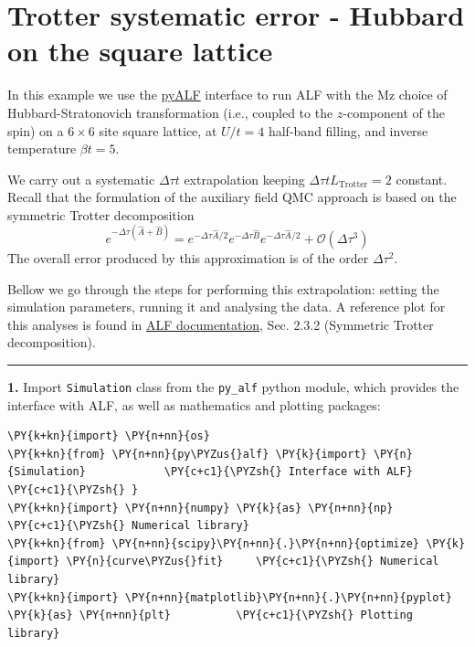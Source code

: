     
    

    
    \hypertarget{trotter-systematic-error---hubbard-on-the-square-lattice}{%
\section{Trotter systematic error - Hubbard on the square
lattice}\label{trotter-systematic-error---hubbard-on-the-square-lattice}}

    In this example we use the
\href{https://git.physik.uni-wuerzburg.de/ALF/pyALF}{pyALF} interface to
run ALF with the Mz choice of Hubbard-Stratonovich transformation (i.e.,
coupled to the \(z\)-component of the spin) on a \(6\times 6\) site
square lattice, at \(U/t=4\) half-band filling, and inverse temperature
\(\beta t = 5\).

We carry out a systematic \(\Delta \tau t\) extrapolation keeping
\(\Delta \tau t L_\text{Trotter} = 2\) constant. Recall that the
formulation of the auxiliary field QMC approach is based on the
symmetric Trotter decomposition \[
e^{ -\Delta \tau \left( \hat{A} + \hat{B} \right) }  =  e^{ -\Delta \tau \hat{A}/2}  e^{ -\Delta \tau  \hat{B}  }   e^{ -\Delta \tau \hat{A}/2}  +  \mathcal{O} \left (\Delta  \tau^3\right)
\] The overall error produced by this approximation is of the order
\(\Delta \tau^2\).

Bellow we go through the steps for performing this extrapolation:
setting the simulation parameters, running it and analysing the data. A
reference plot for this analyses is found in
\href{https://git.physik.uni-wuerzburg.de/ALF/ALF/-/blob/master/Documentation/doc.pdf}{ALF
documentation}, Sec. 2.3.2 (Symmetric Trotter decomposition).

\begin{center}\rule{0.5\linewidth}{\linethickness}\end{center}

\textbf{1.} Import \texttt{Simulation} class from the \texttt{py\_alf}
python module, which provides the interface with ALF, as well as
mathematics and plotting packages:

    \begin{tcolorbox}[breakable, size=fbox, boxrule=1pt, pad at break*=1mm,colback=cellbackground, colframe=cellborder]
\begin{Verbatim}[commandchars=\\\{\}]
\PY{k+kn}{import} \PY{n+nn}{os}
\PY{k+kn}{from} \PY{n+nn}{py\PYZus{}alf} \PY{k}{import} \PY{n}{Simulation}            \PY{c+c1}{\PYZsh{} Interface with ALF}
\PY{c+c1}{\PYZsh{} }
\PY{k+kn}{import} \PY{n+nn}{numpy} \PY{k}{as} \PY{n+nn}{np}                       \PY{c+c1}{\PYZsh{} Numerical library}
\PY{k+kn}{from} \PY{n+nn}{scipy}\PY{n+nn}{.}\PY{n+nn}{optimize} \PY{k}{import} \PY{n}{curve\PYZus{}fit}     \PY{c+c1}{\PYZsh{} Numerical library}
\PY{k+kn}{import} \PY{n+nn}{matplotlib}\PY{n+nn}{.}\PY{n+nn}{pyplot} \PY{k}{as} \PY{n+nn}{plt}          \PY{c+c1}{\PYZsh{} Plotting library}
\end{Verbatim}
\end{tcolorbox}

